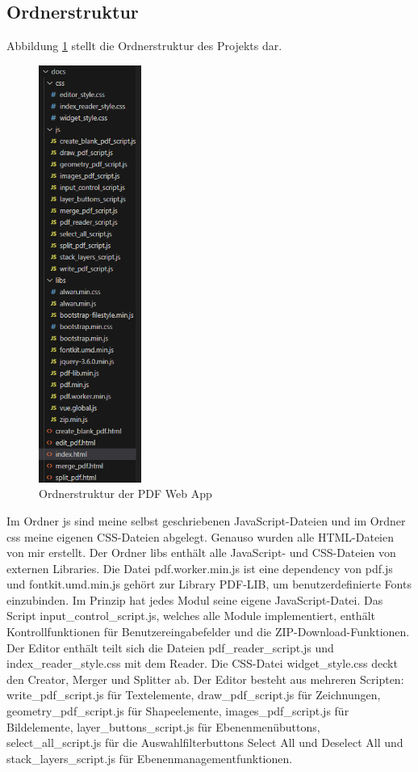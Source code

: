 \subsection{Ordnerstruktur}
Abbildung \ref{fig:folders} stellt die Ordnerstruktur des Projekts dar. 

\begin{figure}[!htbp]
	\centering
	\includegraphics[width=0.3\textwidth]{"images/folders.png"}
	\caption{Ordnerstruktur der PDF Web App}
	\label{fig:folders}
\end{figure}

Im Ordner js sind meine selbst geschriebenen JavaScript-Dateien und im Ordner css meine eigenen CSS-Dateien abgelegt. Genauso wurden alle HTML-Dateien von mir erstellt. Der Ordner libs enthält alle JavaScript- und CSS-Dateien von externen Libraries. Die Datei pdf.worker.min.js ist eine dependency von pdf.js und fontkit.umd.min.js gehört zur Library PDF-LIB, um benutzerdefinierte Fonts einzubinden. Im Prinzip hat jedes Modul seine eigene JavaScript-Datei. Das Script input\_control\_script.js, welches alle Module implementiert, enthält Kontrollfunktionen für Benutzereingabefelder und die ZIP-Download-Funktionen. Der Editor enthält teilt sich die Dateien pdf\_reader\_script.js und index\_reader\_style.css mit dem Reader. Die CSS-Datei widget\_style.css deckt den Creator, Merger und Splitter ab. Der Editor besteht aus mehreren Scripten: write\_pdf\_script.js für Textelemente, draw\_pdf\_script.js für Zeichnungen, geometry\_pdf\_script.js für Shapeelemente, images\_pdf\_script.js für Bildelemente, layer\_buttons\_script.js für Ebenenmenübuttons, select\_all\_script.js für die Auswahlfilterbuttons Select All und Deselect All und stack\_layers\_script.js für Ebenenmanagementfunktionen. 


